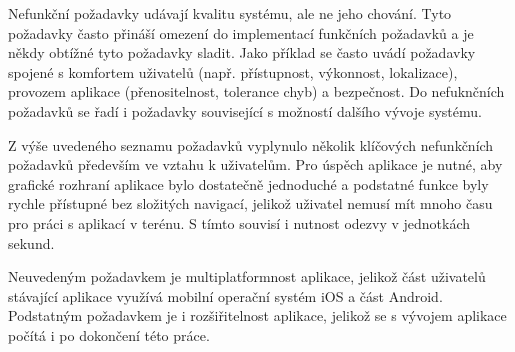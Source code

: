 Nefunkční požadavky udávají kvalitu systému, ale ne jeho chování. Tyto požadavky často přináší omezení do implementací funkčních požadavků a je někdy obtížné tyto požadavky sladit. Jako příklad se často uvádí požadavky spojené s komfortem uživatelů (např. přístupnost, výkonnost, lokalizace), provozem aplikace (přenositelnost, tolerance chyb) a bezpečnost. Do nefuknčních požadavků se řadí i požadavky související s možností dalšího vývoje systému.

Z výše uvedeného seznamu požadavků vyplynulo několik klíčových nefunkčních požadavků především ve vztahu k uživatelům. Pro úspěch aplikace je nutné, aby grafické rozhraní aplikace bylo dostatečně jednoduché a podstatné funkce byly rychle přístupné bez složitých navigací, jelikož uživatel nemusí mít mnoho času pro práci s aplikací v terénu. S tímto souvisí i nutnost odezvy v jednotkách sekund. 

Neuvedeným požadavkem je multiplatformnost aplikace, jelikož část uživatelů stávající aplikace využívá mobilní operační systém iOS a část Android. Podstatným požadavkem je i rozšiřitelnost aplikace, jelikož se s vývojem aplikace počítá i po dokončení této práce. 


